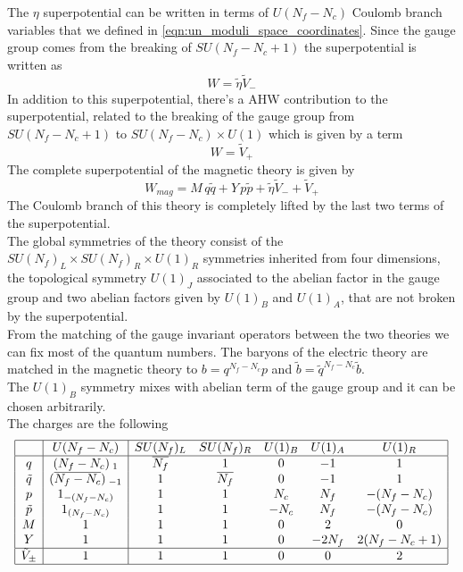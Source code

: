 The $\eta$ superpotential can be written in terms of $U(N_f - N_c)$ Coulomb branch variables that we defined in \eqref{eqn:un_moduli_space_coordinates}.
Since the gauge group comes from the breaking of $SU(N_f - N_c +1) $ the superpotential is written as
\begin{equation}
 W = \tilde{\eta} \tilde{V}_-
 \end{equation} 
In addition to this superpotential, there's a AHW contribution to the superpotential, related to the breaking of the gauge group from $SU(N_f - N_c +1)$ to $SU(N_f - N_c) \times U(1)$ which is given by a term 
\begin{equation}
W = \tilde{V}_+
\end{equation}
The complete superpotential of the magnetic theory is given by
\begin{equation}
W_{mag} = M \, q \tilde{q} + Y \, p \tilde{p} + \tilde{\eta} \tilde{V}_- + \tilde{V}_+
\label{eqn:sun_reduced_duality_superpotential}
\end{equation}
The Coulomb branch of this theory is completely lifted by the last two terms of the superpotential.\\
The global symmetries of the theory consist of the $SU(N_f)_L \times SU(N_f)_R \times U(1)_R$ symmetries inherited from four dimensions, the topological symmetry $U(1)_J$ associated to the abelian factor in the gauge group and two abelian factors given by $U(1)_B$ and $U(1)_A$, that are not broken by the superpotential.\\
From the matching of the gauge invariant operators between the two theories we can fix most of the quantum numbers.
The baryons of the electric theory are matched in the magnetic theory to $b = q^{N_f-N_c} p$ and $\tilde{b} = \tilde{q}^{N_f - N_c} \tilde{b}$.\\
The $U(1)_B$ symmetry mixes with abelian term of the gauge group and it can be chosen arbitrarily.\\
The charges are the following
\begin{equation}
\begin{array} {| c | c | c c c c c |}
\hline
& U(N_f - N_c) & SU(N_f)_L & SU(N_f)_R & U(1)_B & U(1)_A & U(1)_R \\
\hline
q & (N_f - N_c)_{\; 1} & \overline{N_f} & 1 & 0 & -1 & 1 \\
\tilde{q} & (\overline{N_f - N_c})_{\;- 1} &   1& \overline{N_f} & 0 & -1 & 1 \\
p & 1_{-(N_f - N_c)} & 1 &  1 & N_c & N_f & -(N_f - N_c) \\
\tilde{p} & 1_{(N_f - N_c)} & 1 &  1 & - N_c & N_f & -(N_f - N_c) \\
M & 1 & 1 & 1 & 0 & 2 & 0 \\
Y & 1 & 1 & 1 & 0 & - 2 N_f & 2 (N_f - N_c+1)\\
\hline
\tilde{V}_{\pm} & 1 & 1 & 1 &0 & 0 &2\\
\hline
\end{array}
\label{tab:seiberg_3d_charge_mag}
\end{equation}
